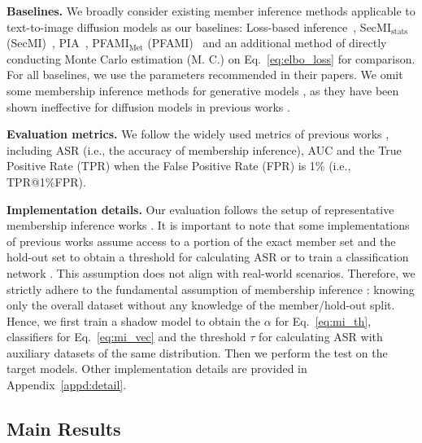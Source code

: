 \textbf{Baselines.} We broadly consider existing member inference methods applicable to text-to-image diffusion models as our baselines: Loss-based inference~\cite{matsumoto2023membership}, SecMI$ _\text{stats} $ (SecMI)~\cite{duan2023diffusion}, PIA~\cite{kong2023efficient},  PFAMI$ _\text{Met} $ (PFAMI)~\cite{fu2023probabilistic} and an additional method of directly conducting Monte Carlo estimation (M. C.) on Eq.~\eqref{eq:elbo_loss} for comparison. For all baselines, we use the parameters recommended in their papers.
We omit some membership inference methods for generative models \cite{liu2019performing, chen2020gan, hayes2019logan}, as they have been shown ineffective for diffusion models in previous works \cite{duan2023diffusion, fu2023probabilistic}.  

\textbf{Evaluation metrics.}  
We follow the widely used metrics of previous works \cite{carlini2022membership,carlini2023extracting, duan2023diffusion, kong2023efficient, fu2023probabilistic}, including ASR (i.e., the accuracy of membership inference), AUC and the True Positive Rate (TPR) when the False Positive Rate (FPR) is 1\% (i.e.,  TPR@1\%FPR). 

\textbf{Implementation details.}
Our evaluation follows the setup of representative membership inference works  \cite{carlini2022membership, carlini2023extracting}. 
It is important to note that some implementations \cite{sec_implement, pia_implement} of previous works assume access to a portion of the exact member set and the hold-out set to obtain a threshold for calculating ASR or to train a classification network \cite{sec_implement}. This assumption does not align with real-world scenarios. 
Therefore, we strictly adhere to the fundamental assumption of membership inference \cite{carlini2022membership, fu2023probabilistic}: knowing only the overall dataset without any knowledge of the member/hold-out split. Hence, we first train a shadow model to obtain the 
$\alpha$ for Eq.~\eqref{eq:mi_th}, classifiers for Eq.~\eqref{eq:mi_vec}  and the threshold $\tau$ for 
calculating ASR with auxiliary datasets of the same distribution. Then we perform the test on the target models.
Other implementation details are provided in Appendix~\ref{appd:detail}.

\vspace{-7pt}
\subsection{Main Results}
\vspace{-3pt}

